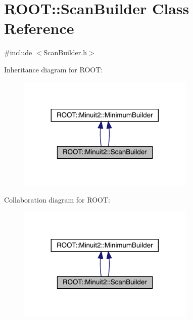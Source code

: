 \hypertarget{classROOT_1_1Minuit2_1_1ScanBuilder}{}\section{R\+O\+OT\+:\+:Scan\+Builder Class Reference}
\label{classROOT_1_1Minuit2_1_1ScanBuilder}


{\ttfamily \#include $<$Scan\+Builder.\+h$>$}



Inheritance diagram for R\+O\+OT\+:\nopagebreak
\begin{figure}[H]
\begin{center}
\leavevmode
\includegraphics[width=239pt]{d2/d5e/classROOT_1_1Minuit2_1_1ScanBuilder__inherit__graph}
\end{center}
\end{figure}


Collaboration diagram for R\+O\+OT\+:\nopagebreak
\begin{figure}[H]
\begin{center}
\leavevmode
\includegraphics[width=239pt]{da/df9/classROOT_1_1Minuit2_1_1ScanBuilder__coll__graph}
\end{center}
\end{figure}

